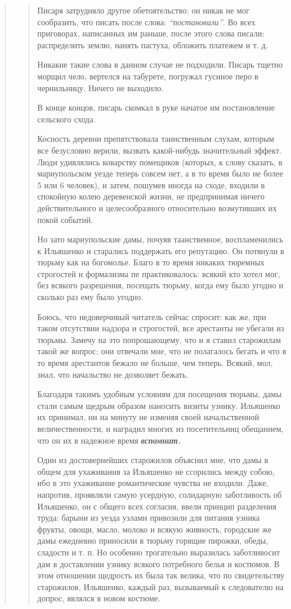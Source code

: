 \begin{quote}
\begin{quote}
Писаря затрудняло другое обетоятельство: он никак
не мог сообразить, что писать после слова: \emph{``постановили''}.
Во всех приговорах, написанных им раньше, после этого слова писали:
распределить землю, нанять пастуха, обложить платежем и т. д.

Никакие такие слова в данном случае не подходили. Писарь тщетно морщил чело,
вертелся на табурете, погружал гусиное перо в чернильницу.  Ничего не выходило.

В конце концов, писарь скомкал в руке начатое
им постановление сельского схода.

Косность деревни препятствовала таинственным слухам, которым все безусловно
верили, вызвать какой-нибудь значительный эффект. Люди удивлялись коварству
помещиков (которых, к слову сказать, в мариупольском уезде теперь совсем нет, а
в то время было не более 5 или 6 человек), и затем, пошумев иногда на сходе,
входили в спокойную колею деревенской жизни, не предпринимая ничего
действительного и целесообразного относительно возмутивших их покой событий.

Но зато мариупольские дамы, почуяв таанственное, воспламенились к Ильяшенко и
старались поддержать его репутацию. Он потянули в тюрьму как на богомолье.
Благо в то время никаких тюремных строгостей и формализма пе практиковалось:
всякий кто хотел мог, без всякого разрешения, посещать тюрьму, когда ему было
угодно и сколько раз ему было угодно.

Боюсь, что недоверчивый читатель сейчас спросит: как же, при таком отсутствии
надзора и строгостей, все арестанты не убегали из тюрьмы. Замечу на это
попрошающему, что и я ставил старожилам такой же вопрос; они отвечали мне, что
не полагалось бегать и что в то время арестантов бежало не больше, чем теперь.
Всякий, мол, знал, что начальство не дозволяет бежать.

Благодаря такимъ удобным условиям для посещения тюрьмы, дамы стали самым
щедрым образом наносить визиты узнику. Ильяшенко их принимал, ни на минуту не
изменяя своей начальственной величественности, и наградил многих из
посетительниц обещанием, что он их в надежное время \textbf{\em вспомнит.}

Один из достовернейших старожилов объяснил мне, что дамы в общем для ухаживания
за Ильяшенко не ссорились между собою, ибо в это ухаживание романтические
чувства не входили.  Даже, напротив, проявляли самую усердную, солидарную
заботливость об Ильяшенко, он с общего всех согласия, ввели принцип разделения
труда: барыни из уезда узлами привозили для питания узника фрукты, овощи,
масло, молоко и всякую живность, городские же дамы ежедневно приносили в тюрьму
горящие пирожки, обеды, сладости и т. п. Но особенно трогательно выразилась
заботливосит дам в доставлении узнику всякого потребного белья и костюмов. В
этом отношении щедрость их была так велика, что по свидетельству старожилов,
Ильяшенко, каждый раз, вызываемый к следователю на допрос, являлся в новом
костюме.


\end{quote}
\end{quote}
